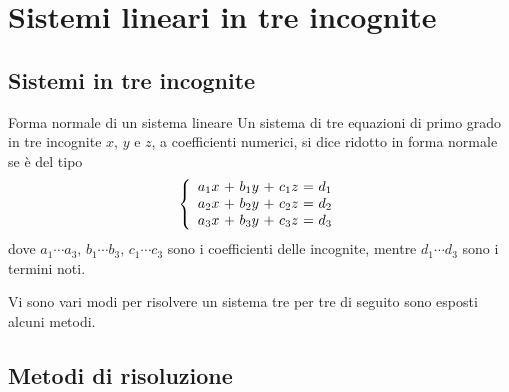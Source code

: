 \chapter{Sistemi lineari in tre incognite}
\label{sec:sistemiLineariIntreIncognite}


\section{Sistemi in tre incognite}
\label{sec:Sistemi3}

\begin{definizionet}{Forma normale di un sistema lineare}{}
Un sistema di tre equazioni di primo grado in tre incognite $x$, $y$ e $z$, a coefficienti numerici, si dice ridotto in forma normale se è del tipo
\[\left\{
\begin{array}{*{3}{r@{~}c@{~}}r}
a_1x & + & b_1y & + & c_1z & =&d_1\\
a_2x & + & b_2y & + & c_2z & =&d_2\\
a_3x & + & b_3y & + & c_3z & =&d_3\\
\end{array}\right.\]
dove $a_1\cdots a_3\text{,~}b_1\cdots b_3\text{,~}c_1\cdots c_3$ sono i   coefficienti delle incognite, mentre $d_1\cdots d_3$ sono i termini noti.
\end{definizionet}
Vi sono vari modi per risolvere un sistema tre per tre di seguito sono esposti alcuni metodi.
\section{Metodi di risoluzione}
\label{sec:MetodiDiRisoluzionetre}
